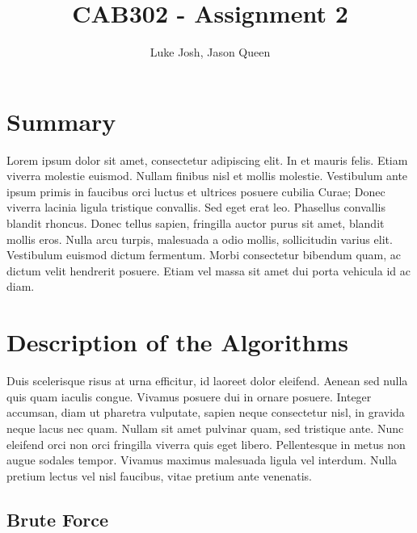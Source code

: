\documentclass{article}
\title{CAB302 - Assignment 2}
\author{Luke Josh, Jason Queen}
\begin{document}

\maketitle
\tableofcontents

\section{Summary}
    Lorem ipsum dolor sit amet, consectetur adipiscing elit. In et mauris felis. Etiam viverra molestie euismod. Nullam finibus nisl et mollis molestie. Vestibulum ante ipsum primis in faucibus orci luctus et ultrices posuere cubilia Curae; Donec viverra lacinia ligula tristique convallis. Sed eget erat leo. Phasellus convallis blandit rhoncus. Donec tellus sapien, fringilla auctor purus sit amet, blandit mollis eros. Nulla arcu turpis, malesuada a odio mollis, sollicitudin varius elit. Vestibulum euismod dictum fermentum. Morbi consectetur bibendum quam, ac dictum velit hendrerit posuere. Etiam vel massa sit amet dui porta vehicula id ac diam.

\section{Description of the Algorithms}
    Duis scelerisque risus at urna efficitur, id laoreet dolor eleifend. Aenean sed nulla quis quam iaculis congue. Vivamus posuere dui in ornare posuere. Integer accumsan, diam ut pharetra vulputate, sapien neque consectetur nisl, in gravida neque lacus nec quam. Nullam sit amet pulvinar quam, sed tristique ante. Nunc eleifend orci non orci fringilla viverra quis eget libero. Pellentesque in metus non augue sodales tempor. Vivamus maximus malesuada ligula vel interdum. Nulla pretium lectus vel nisl faucibus, vitae pretium ante venenatis.
    \subsection{Brute Force}
\end{document}

